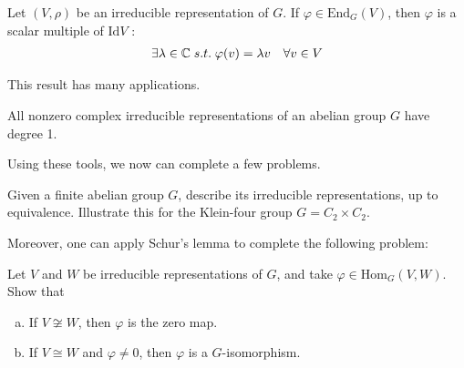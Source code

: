 \documentclass{memoir}
\begin{document}
\begin{lemma}
	Let \((V,\rho)\) be an irreducible representation of \(G\). If \(\varphi \in \textrm{End}_G(V)\), then \(\varphi\) is a scalar multiple of \(\textrm{Id}V\) :
	\begin{align*}
		\exists \lambda \in \mathbb{C} \; s.t. \; \varphi(v) = \lambda v \quad \forall v \in V
	\end{align*}
\end{lemma}
This result has many applications.
\begin{thm}
	All nonzero complex irreducible representations of an abelian group \(G\) have degree 1.
\end{thm}
Using these tools, we now can complete a few problems.

\begin{hw}
	Given a finite abelian group \(G\), describe its irreducible representations, up to equivalence. Illustrate this for the Klein-four group \(G = C_2\times C_2\).
\end{hw}
Moreover, one can apply Schur's lemma to complete the following problem:
\begin{hw}
	Let \(V\) and \(W\) be irreducible representations of \(G\), and take \(\varphi \in \textrm{Hom}_G(V,W)\). Show that
	\begin{enumerate}[(a).]
		\item If \(V \not\cong W\), then \(\varphi\) is the zero map.
		\item If \(V \cong W\) and \(\varphi\neq 0\), then \(\varphi\) is a \(G\)-isomorphism.
	\end{enumerate}
\end{hw} %
\end{document}
